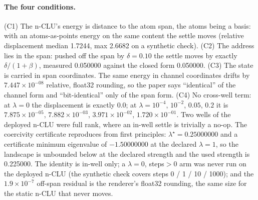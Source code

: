 \documentclass{article} %
\newcommand{\sci}[2]{\ensuremath{#1\times10^{#2}}}
\begin{document}
\paragraph{The four conditions.} (C1) The n-CLU's energy is distance to the atom span, the atoms
being a basis: with an atoms-as-points energy on the same content the settle moves (relative
displacement median 1.7244, max 2.6682 on a synthetic check). (C2) The address lies in the span:
pushed off the span by $\delta=0.10$ the settle moves by exactly $\delta/(1+\beta)$, measured
0.050000 against the closed form 0.050000. (C3) The state is carried in span coordinates. The same
energy in channel coordinates drifts by \sci{7.447}{-08} relative, float32 rounding, so the paper
says ``identical'' of the channel form and ``bit-identical'' only of the span form. (C4) No
cross-well term: at $\lambda=0$ the displacement is exactly 0.0; at
$\lambda=10^{-4}$, $10^{-2}$, $0.05$, $0.2$ it is \sci{7.875}{-05}, \sci{7.882}{-03},
\sci{3.971}{-02}, \sci{1.720}{-01}. Two wells of the deployed n-CLU were full rank, where an in-well
settle is trivially a no-op. The coercivity certificate reproduces from first principles:
$\lambda^\star=0.25000000$ and a certificate minimum eigenvalue of $-1.50000000$ at the declared
$\lambda=1$, so the landscape is unbounded below at the declared strength and the used strength is
0.225000. %
The identity is in-well only; a $\lambda=0$, steps$>0$ arm was never run on the deployed n-CLU (the
synthetic check covers steps 0 / 1 / 10 / 1000); and the \sci{1.9}{-7} off-span residual is the
renderer's float32 rounding, the same size for the static n-CLU that never moves.
\end{document}
